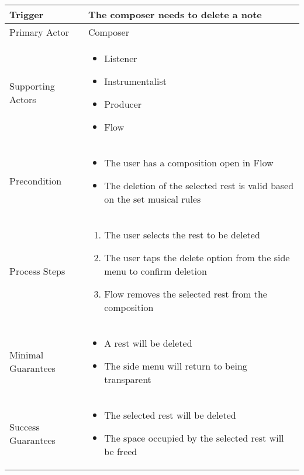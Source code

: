 \begin{longtable}{|X|X|}
\hline
Trigger & 
The composer needs to delete a note \\
\hline
Primary Actor & 
Composer\\
\hline
Supporting Actors & 
\begin{itemize}
\item Listener
\item Instrumentalist
\item Producer
\item Flow
\end{itemize} \\
\hline
Precondition & 
\begin{itemize}
\item The user has a composition open in Flow 
\item The deletion of the selected rest is valid based on the set musical rules
\end{itemize} \\
\hline
Process Steps & 
\begin{enumerate}
\item The user selects the rest to be deleted 
\item The user taps the delete option from the side menu to confirm deletion
\item Flow removes the selected rest from the composition
\end{enumerate} \\
\hline
Minimal Guarantees & 
\begin{itemize}
  \item A rest will be deleted
  \item The side menu will return to being transparent
\end{itemize} \\
\hline
Success Guarantees & 
\begin{itemize}
  \item The selected rest will be deleted
  \item The space occupied by the selected rest will be freed
\end{itemize} \\
\hline
\end{longtable}